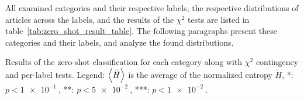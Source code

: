 All examined categories and their respective labels, the respective distributions of articles across the labels, and the results of the $\chi^2$ tests are listed in table~\ref{tab:zero_shot_result_table}. The following paragraphs present these categories and their labels, and analyze the found distributions.
\begin{table}
    \centering
    \resizebox{0.85\textwidth}{!}{}
    \caption{Results of the zero-shot classification for each category along with $\chi^2$ contingency and per-label tests. Legend: $\Braket{\widetilde{H}}$ is the average of the normalized entropy $\widetilde{H}$, *: $p < \SI{1e-1}{}$, **: $p<\SI{5e-2}{}$, ***: $p<\SI{1e-2}{}$.}\label{tab:zero_shot_result_table}
\end{table}

